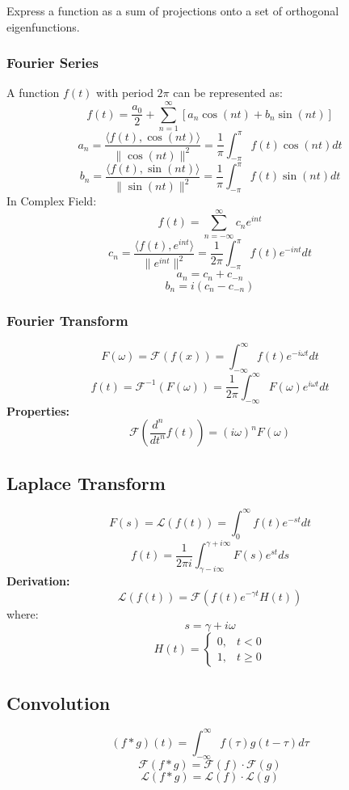 \documentclass{article}
\begin{document}
Express a function as a sum of projections onto a set of orthogonal eigenfunctions.

\subsubsection{Fourier Series}

A function $f(t)$ with period $2\pi$ can be represented as:
\[
    f(t) = \frac{a_0}{2} + \sum_{n=1}^{\infty} \left[a_n \cos(nt) + b_n \sin(nt)\right]
\]
\[
    a_n = \frac{\langle f(t), \cos(nt) \rangle}{\|\cos(nt)\|^2} = \frac{1}{\pi} \int_{-\pi}^{\pi} f(t) \cos(nt) dt
\]
\[
    b_n = \frac{\langle f(t), \sin(nt) \rangle}{\|\sin(nt)\|^2} = \frac{1}{\pi} \int_{-\pi}^{\pi} f(t) \sin(nt) dt
\]
In Complex Field:
\[
    f(t) = \sum_{n=-\infty}^{\infty} c_n e^{int}
\]
\[
    c_n = \frac{\langle f(t), e^{int} \rangle}{\|e^{int}\|^2} = \frac{1}{2\pi} \int_{-\pi}^{\pi} f(t) e^{-int} dt
\]
\[
    a_n = c_n + c_{-n}
\]
\[
    b_n = i(c_n - c_{-n})
\]

\subsubsection{Fourier Transform}

\[
    F(\omega) = \mathcal{F}(f(x)) = \int_{-\infty}^{\infty} f(t) e^{-i\omega t} dt
\]
\[
    f(t) = \mathcal{F}^{-1}(F(\omega)) = \frac{1}{2\pi} \int_{-\infty}^{\infty} F(\omega) e^{i\omega t} dt
\]
\textbf{Properties:}
\[
    \mathcal{F}\left(\frac{d^n}{dt^n} f(t)\right) = (i\omega)^n F(\omega)
\]

\subsection{Laplace Transform}

\[
    F(s) = \mathcal{L}(f(t)) = \int_0^{\infty} f(t) e^{-st} dt
\]
\[
    f(t) = \frac{1}{2\pi i} \int_{\gamma - i\infty}^{\gamma + i\infty} F(s) e^{st} ds
\]
\textbf{Derivation:}
\[
    \mathcal{L}(f(t)) = \mathcal{F}(f(t) e^{-\gamma t} H(t))
\]
where:
\[
    s = \gamma + i\omega
\]
\[
    H(t) = \begin{cases}
        0, & t < 0 \\
        1, & t \geq 0
    \end{cases}
\]

\subsection{Convolution}

\[
    (f * g)(t) = \int_{-\infty}^{\infty} f(\tau) g(t - \tau) d\tau
\]
\[
    \mathcal{F}(f * g) = \mathcal{F}(f) \cdot \mathcal{F}(g)
\]
\[
    \mathcal{L}(f * g) = \mathcal{L}(f) \cdot \mathcal{L}(g)
\]
\end{document}
